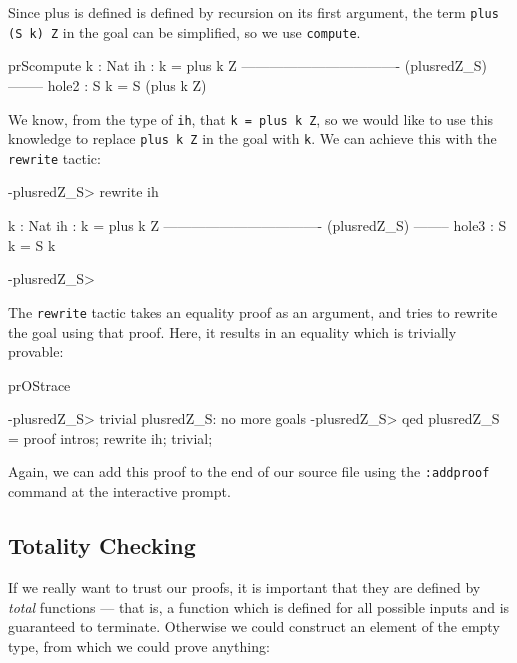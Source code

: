 \noindent
Since plus is defined is defined by recursion on its first argument, the term
\texttt{plus (S k) Z} in the goal can be simplified, so we use
\texttt{compute}.

\begin{SaveVerbatim}{prScompute}
  k : Nat
  ih : k = plus k Z
---------------------------------- (plusredZ_S) --------
{hole2} : S k = S (plus k Z)

\end{SaveVerbatim}

\noindent
We know, from the type of \texttt{ih}, that \texttt{k = plus k Z}, so we would like to
use this knowledge to replace \texttt{plus k Z} in the goal with \texttt{k}. We can
achieve this with the \texttt{rewrite} tactic:

\begin{SaveVerbatim}{}

-plusredZ_S> rewrite ih

  k : Nat
  ih : k = plus k Z
---------------------------------- (plusredZ_S) --------
{hole3} : S k = S k

-plusredZ_S>

\end{SaveVerbatim}
\useverb{}

\noindent
The \texttt{rewrite} tactic takes an equality proof as an argument, and tries to rewrite
the goal using that proof. Here, it results in an equality which is trivially provable:

\begin{SaveVerbatim}{prOStrace}

-plusredZ_S> trivial
plusredZ_S: no more goals
-plusredZ_S> qed
plusredZ_S = proof {
    intros;
    rewrite ih;
    trivial;
}

\end{SaveVerbatim}

\noindent
Again, we can add this proof to the end of our source file using the \texttt{:addproof}
command at the interactive prompt.

\subsection{Totality Checking}

\label{sect:totality}

If we really want to trust our proofs, it is important that they are defined by
\emph{total} functions --- that is, a function which is defined for all
possible inputs and is guaranteed to terminate. Otherwise we could construct an
element of the empty type, from which we could prove anything:

